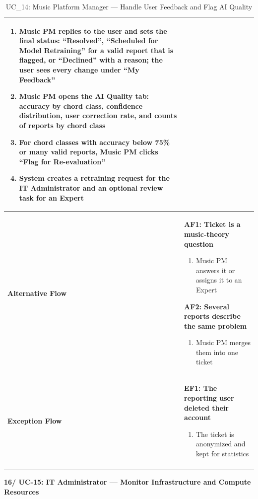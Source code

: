 \documentclass[a4paper]{article}
\newlength{\ucLeft}
\begin{document}
\begin{longtable}{|>{\bfseries}p{\ucLeft}|p{\dimexpr\linewidth-\ucLeft-2\tabcolsep-2\arrayrulewidth}|}
\begin{enumerate}[leftmargin=1.5em, nosep, topsep=2pt, partopsep=0pt, parsep=0pt, after=\strut]
    \item Music PM replies to the user and sets the final status: ``Resolved'', ``Scheduled for Model Retraining'' for a valid report that is flagged, or ``Declined'' with a reason; the user sees every change under ``My Feedback''
    \item Music PM opens the AI Quality tab: accuracy by chord class, confidence distribution, user correction rate, and counts of reports by chord class
    \item For chord classes with accuracy below 75\% or many valid reports, Music PM clicks ``Flag for Re-evaluation''
    \item System creates a retraining request for the IT Administrator and an optional review task for an Expert
\end{enumerate}
\\ \hline
Alternative Flow &
\textbf{AF1: Ticket is a music-theory question}
\begin{enumerate}[leftmargin=1.5em, nosep, topsep=2pt, partopsep=0pt, parsep=0pt, after=\strut]
    \item Music PM answers it or assigns it to an Expert
\end{enumerate}
\textbf{AF2: Several reports describe the same problem}
\begin{enumerate}[leftmargin=1.5em, nosep, topsep=2pt, partopsep=0pt, parsep=0pt, after=\strut]
    \item Music PM merges them into one ticket
\end{enumerate}
\\ \hline
Exception Flow &
\textbf{EF1: The reporting user deleted their account}
\begin{enumerate}[leftmargin=1.5em, nosep, topsep=2pt, partopsep=0pt, parsep=0pt, after=\strut]
    \item The ticket is anonymized and kept for statistics
\end{enumerate}
\\ \hline
\caption{UC\_14: Music Platform Manager --- Handle User Feedback and Flag AI Quality}\label{tab:uc14_feedback}
\end{longtable}

\vspace{0.5em}
\noindent\textbf{16/ UC-15: IT Administrator --- Monitor Infrastructure and Compute Resources}
\end{document}
